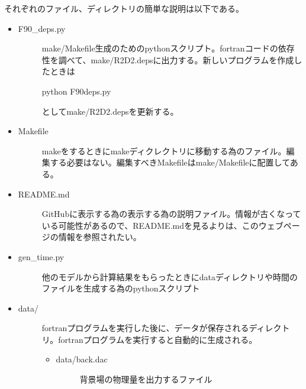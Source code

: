 \documentclass[letterpaper,10pt,dvipdfmx,report]{sphinxmanual}
\begin{document}
それぞれのファイル、ディレクトリの簡単な説明は以下である。
\begin{itemize}
\item {} \begin{description}
\item[{F90\_deps.py}] \leavevmode
make/Makefile生成のためのpythonスクリプト。fortranコードの依存性を調べて、make/R2D2.depsに出力する。新しいプログラムを作成したときは

\begin{sphinxVerbatim}[commandchars=\\\{\}]
python F90\PYGZus{}deps.py
\end{sphinxVerbatim}

としてmake/R2D2.depsを更新する。

\end{description}

\item {} \begin{description}
\item[{Makefile}] \leavevmode
makeをするときにmakeディクレクトリに移動する為のファイル。編集する必要はない。編集すべきMakefileはmake/Makefileに配置してある。

\end{description}

\item {} \begin{description}
\item[{README.md}] \leavevmode
GitHubに表示する為の表示する為の説明ファイル。情報が古くなっている可能性があるので、README.mdを見るよりは、このウェブページの情報を参照されたい。

\end{description}

\item {} \begin{description}
\item[{gen\_time.py}] \leavevmode
他のモデルから計算結果をもらったときにdataディレクトリや時間のファイルを生成する為のpythonスクリプト

\end{description}

\item {} \begin{description}
\item[{data/}] \leavevmode
fortranプログラムを実行した後に、データが保存されるディレクトリ。fortranプログラムを実行すると自動的に生成される。
\begin{itemize}
\item {} \begin{description}
\item[{data/back.dac}] \leavevmode
背景場の物理量を出力するファイル


\end{description}
\end{itemize}
\end{description}
\end{itemize}
\end{document}

